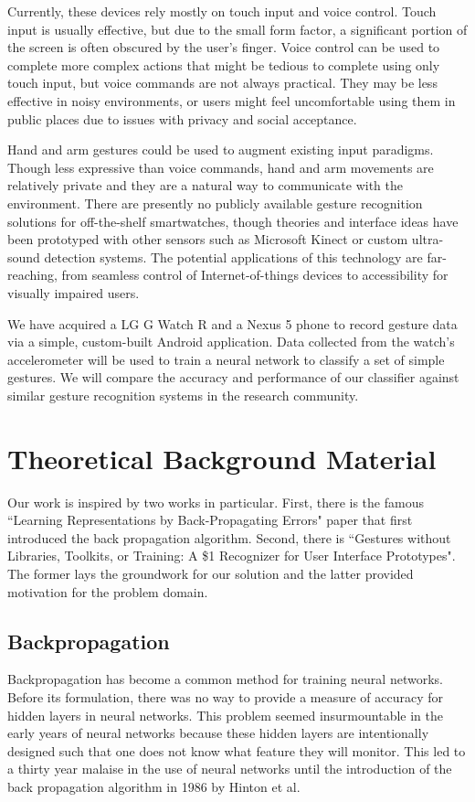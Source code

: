 \documentclass{report}
\begin{document}
Currently, these devices rely mostly on touch input and voice control. Touch input is usually effective, but due to the small form factor, a significant portion of the screen is often obscured by the user's finger. Voice control can be used to complete more complex actions that might be tedious to complete using only touch input, but voice commands are not always practical. They may be less effective in noisy environments, or users might feel uncomfortable using them in public places due to issues with privacy and social acceptance.

Hand and arm gestures could be used to augment existing input paradigms. Though less expressive than voice commands, hand and arm movements are relatively private and they are a natural way to communicate with the environment. There are presently no publicly available gesture recognition solutions for off-the-shelf smartwatches, though theories and interface ideas have been prototyped with other sensors such as Microsoft Kinect or custom ultra-sound detection systems. The potential applications of this technology are far-reaching, from seamless control of Internet-of-things devices to accessibility for visually impaired users.

We have acquired a LG G Watch R and a Nexus 5 phone to record gesture data via a simple, custom-built Android application. Data collected from the watch's accelerometer will be used to train a neural network to classify a set of simple gestures. We will compare the accuracy and performance of our classifier against similar gesture recognition systems in the research community.

\chapter{Theoretical Background Material}
Our work is inspired by two works in particular. First, there is the famous ``Learning Representations by Back-Propagating Errors" paper that first introduced the back propagation algorithm. Second, there is ``Gestures without Libraries, Toolkits, or Training: A \$1 Recognizer for User Interface Prototypes". The former lays the groundwork for our solution and the latter provided motivation for the problem domain.

\section{Backpropagation}
Backpropagation has become a common method for training neural networks. Before its formulation,  there was no way to provide a measure of accuracy for hidden layers in neural networks. This problem seemed insurmountable in the early years of neural networks because these hidden layers are intentionally designed such that one does not know what feature they will monitor. This led to a thirty year malaise in the use of neural networks until the introduction of the back propagation algorithm in 1986 by Hinton et al. \cite{Orr}
\end{document}
